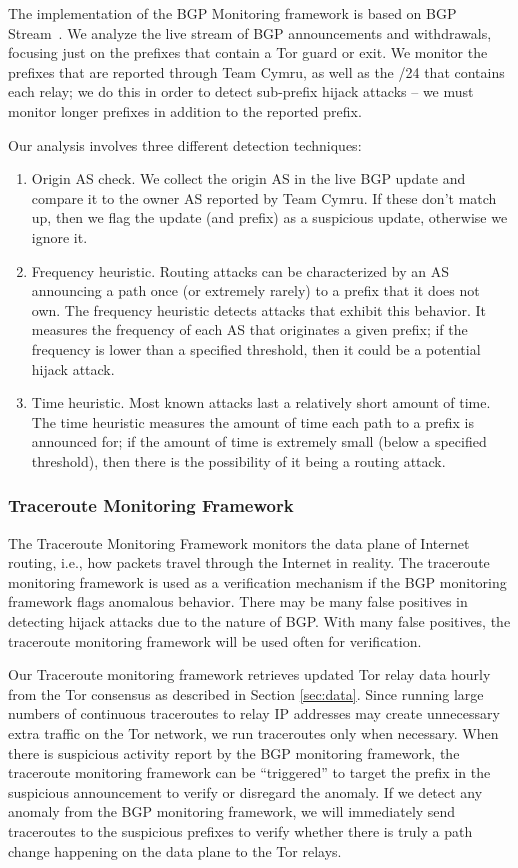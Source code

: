 The implementation of the BGP Monitoring framework is based on BGP Stream~\cite{bgpstream}.  We analyze the live stream of BGP announcements and withdrawals, focusing just on the prefixes that contain a Tor guard or exit.  We monitor the prefixes that are reported through Team Cymru, as well as the /24 that contains each relay; we do this in order to detect sub-prefix hijack attacks -- we must monitor longer prefixes in addition to the reported prefix.  

Our analysis involves three different detection techniques:

\begin{enumerate}
\item Origin AS check.  We collect the origin AS in the live BGP update and compare it to the owner AS reported by Team Cymru.  If these don't match up, then we flag the update (and prefix) as a suspicious update, otherwise we ignore it. 
\item Frequency heuristic.  Routing attacks can be 
characterized by an AS announcing a path once (or extremely rarely) to a prefix 
that it does not own.  The frequency heuristic detects attacks that exhibit this behavior. 
It measures the frequency of each AS that originates a given prefix; if the frequency is 
lower than a specified threshold, then it could be a potential hijack attack.
\item Time heuristic.  Most known attacks 
last a relatively short amount of time. The time heuristic measures the amount of time each 
path to a prefix is announced for; if the amount of time is extremely small (below a specified threshold), 
then there is the possibility of it being a routing attack. 
\end{enumerate}  

\subsubsection{Traceroute Monitoring Framework} 
The Traceroute Monitoring Framework monitors the data plane of Internet routing, i.e., how packets travel through the Internet in reality. The traceroute monitoring framework is used as a verification mechanism if the BGP monitoring framework flags anomalous behavior. There may be many false positives in detecting hijack attacks due to the nature of BGP.  With many false positives, the traceroute monitoring framework will be used often for verification.

Our Traceroute monitoring framework retrieves updated Tor relay data hourly from the Tor consensus as described in Section \ref{sec:data}. Since running large numbers of continuous traceroutes to relay IP addresses may create unnecessary extra traffic on the Tor network, we run traceroutes only when necessary.  When there is suspicious activity report by the BGP monitoring framework, the traceroute monitoring framework can be ``triggered'' to target the prefix in the suspicious announcement to verify or disregard the anomaly. If we detect any anomaly from the BGP monitoring framework, we will immediately send traceroutes to the suspicious prefixes to verify whether there is truly a path change happening on the data plane to the Tor relays. 

